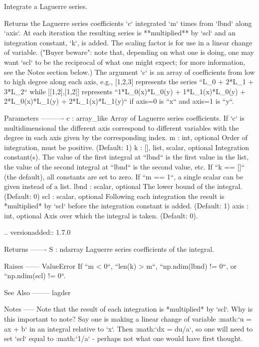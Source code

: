 \begin{DoxyVerb}Integrate a Laguerre series.

Returns the Laguerre series coefficients `c` integrated `m` times from
`lbnd` along `axis`. At each iteration the resulting series is
**multiplied** by `scl` and an integration constant, `k`, is added.
The scaling factor is for use in a linear change of variable.  ("Buyer
beware": note that, depending on what one is doing, one may want `scl`
to be the reciprocal of what one might expect; for more information,
see the Notes section below.)  The argument `c` is an array of
coefficients from low to high degree along each axis, e.g., [1,2,3]
represents the series ``L_0 + 2*L_1 + 3*L_2`` while [[1,2],[1,2]]
represents ``1*L_0(x)*L_0(y) + 1*L_1(x)*L_0(y) + 2*L_0(x)*L_1(y) +
2*L_1(x)*L_1(y)`` if axis=0 is ``x`` and axis=1 is ``y``.


Parameters
----------
c : array_like
    Array of Laguerre series coefficients. If `c` is multidimensional
    the different axis correspond to different variables with the
    degree in each axis given by the corresponding index.
m : int, optional
    Order of integration, must be positive. (Default: 1)
k : {[], list, scalar}, optional
    Integration constant(s).  The value of the first integral at
    ``lbnd`` is the first value in the list, the value of the second
    integral at ``lbnd`` is the second value, etc.  If ``k == []`` (the
    default), all constants are set to zero.  If ``m == 1``, a single
    scalar can be given instead of a list.
lbnd : scalar, optional
    The lower bound of the integral. (Default: 0)
scl : scalar, optional
    Following each integration the result is *multiplied* by `scl`
    before the integration constant is added. (Default: 1)
axis : int, optional
    Axis over which the integral is taken. (Default: 0).

    .. versionadded:: 1.7.0

Returns
-------
S : ndarray
    Laguerre series coefficients of the integral.

Raises
------
ValueError
    If ``m < 0``, ``len(k) > m``, ``np.ndim(lbnd) != 0``, or
    ``np.ndim(scl) != 0``.

See Also
--------
lagder

Notes
-----
Note that the result of each integration is *multiplied* by `scl`.
Why is this important to note?  Say one is making a linear change of
variable :math:`u = ax + b` in an integral relative to `x`.  Then
:math:`dx = du/a`, so one will need to set `scl` equal to
:math:`1/a` - perhaps not what one would have first thought.


\end{DoxyVerb}
